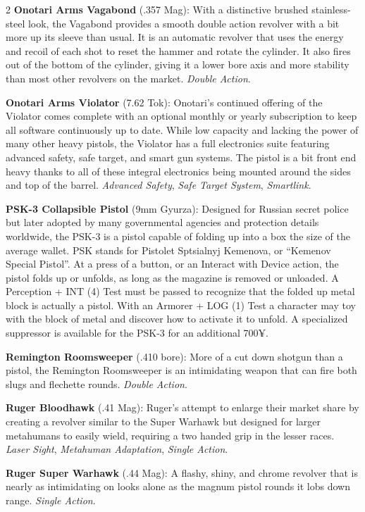 \documentclass[
  oneside]{article}
\begin{document}
\begin{multicols}{2}
\textbf{Onotari Arms Vagabond} (.357 Mag): With a
distinctive brushed stainless-steel look, the
Vagabond provides a smooth double action revolver
with a bit more up its sleeve than usual. It is an
automatic revolver that uses the energy and recoil
of each shot to reset the hammer and rotate the
cylinder. It also fires out of the bottom of the
cylinder, giving it a lower bore axis and more
stability than most other revolvers on the market.
\emph{Double Action}.

\textbf{Onotari Arms Violator} (7.62 Tok):
Onotari's continued offering of the Violator comes
complete with an optional monthly or yearly
subscription to keep all software continuously up
to date. While low capacity and lacking the power
of many other heavy pistols, the Violator has a
full electronics suite featuring advanced safety,
safe target, and smart gun systems. The pistol is
a bit front end heavy thanks to all of these
integral electronics being mounted around the
sides and top of the barrel. \emph{Advanced
Safety}, \emph{Safe Target System},
\emph{Smartlink}.

\textbf{PSK-3 Collapsible Pistol} (9mm Gyurza):
Designed for Russian secret police but later
adopted by many governmental agencies and
protection details worldwide, the PSK-3 is a
pistol capable of folding up into a box the size
of the average wallet. PSK stands for Pistolet
Sptsialnyj Kemenova, or ``Kemenov Special
Pistol''. At a press of a button, or an Interact
with Device action, the pistol folds up or
unfolds, as long as the magazine is removed or
unloaded. A Perception + INT (4) Test must be
passed to recognize that the folded up metal block
is actually a pistol. With an Armorer + LOG (1)
Test a character may toy with the block of metal
and discover how to activate it to unfold. A
specialized suppressor is available for the PSK-3
for an additional 700¥.

\textbf{Remington Roomsweeper} (.410 bore): More
of a cut down shotgun than a pistol, the Remington
Roomsweeper is an intimidating weapon that can
fire both slugs and flechette rounds. \emph{Double
Action}.

\textbf{Ruger Bloodhawk} (.41 Mag): Ruger's
attempt to enlarge their market share by creating
a revolver similar to the Super Warhawk but
designed for larger metahumans to easily wield,
requiring a two handed grip in the lesser races.
\emph{Laser Sight}, \emph{Metahuman Adaptation},
\emph{Single Action}.

\textbf{Ruger Super Warhawk} (.44 Mag): A flashy,
shiny, and chrome revolver that is nearly as
intimidating on looks alone as the magnum pistol
rounds it lobs down range. \emph{Single Action}.


\end{multicols}
\end{document}

